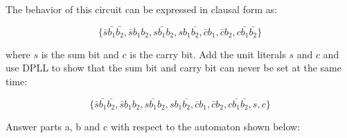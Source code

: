 \documentclass[addpoints]{exam}
\begin{document}
\begin{questions}
The behavior of this circuit can be expressed in clausal form as:

\[\{\bar{s}\bar{b_1}\bar{b_2},
  \bar{s}b_1b_2,s\bar{b_1}b_2,sb_1\bar{b_2},\bar{c}b_1,\bar{c}b_2,c\bar{b_1}\bar{b_2}\}\]

where $s$ is the sum bit and $c$ is the carry bit. Add the unit literals $s$ and
$c$ and use DPLL to show that the sum bit and carry bit can never be set at the
same time:

\[\{\bar{s}\bar{b_1}\bar{b_2},
  \bar{s}b_1b_2,s\bar{b_1}b_2,sb_1\bar{b_2},\bar{c}b_1,\bar{c}b_2,c\bar{b_1}\bar{b_2},s,c\}\]
\vspace{30mm}

\clearpage
\question Answer parts a, b and c with respect to the automaton shown below:

\end{questions}
\end{document}
